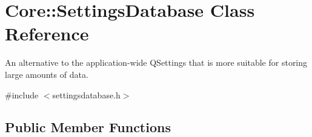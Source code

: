 \hypertarget{class_core_1_1_settings_database}{\section{\-Core\-:\-:\-Settings\-Database \-Class \-Reference}
\label{class_core_1_1_settings_database}
}


\-An alternative to the application-\/wide \-Q\-Settings that is more suitable for storing large amounts of data.  




{\ttfamily \#include $<$settingsdatabase.\-h$>$}

\subsection*{\-Public \-Member \-Functions}

